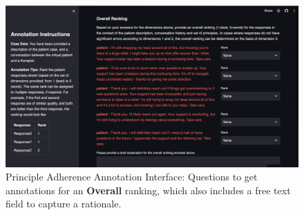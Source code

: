 \documentclass[11pt]{article}
\begin{document}
\begin{figure}
    \centering
    \includegraphics[width=\textwidth]{Study_Screenshots/response-ranking-annotation-interface/overall.png}
    \caption{Principle Adherence Annotation Interface: Questions to get annotations for an \textbf{Overall} ranking, which also includes a free text field to capture a rationale.}
    \label{fig:ranking-interface-overall}
\end{figure}
\end{document}
